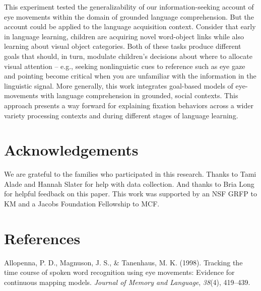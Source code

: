 \documentclass[10pt, letterpaper]{article}
\begin{document}
This experiment tested the generalizability of our information-seeking
account of eye movements within the domain of grounded language
comprehension. But the account could be applied to the language
acquisition context. Consider that early in language learning, children
are acquiring novel word-object links while also learning about visual
object categories. Both of these tasks produce different goals that
should, in turn, modulate children's decisions about where to allocate
visual attention -- e.g., seeking nonlinguistic cues to reference such
as eye gaze and pointing become critical when you are unfamiliar with
the information in the linguistic signal. More generally, this work
integrates goal-based models of eye-movements with language
comprehension in grounded, social contexts. This approach presents a way
forward for explaining fixation behaviors across a wider variety
processing contexts and during different stages of language learning.

\vspace{1em}
\vspace{1em}

\section{Acknowledgements}\label{acknowledgements}

We are grateful to the families who participated in this research.
Thanks to Tami Alade and Hannah Slater for help with data collection.
And thanks to Bria Long for helpful feedback on this paper. This work
was supported by an NSF GRFP to KM and a Jacobs Foundation Fellowship to
MCF.

\section{References}\label{references}

\setlength{\parindent}{-0.1in} \setlength{\leftskip}{0.125in} \noindent

\hypertarget{refs}{}
\hypertarget{ref-allopenna1998tracking}{}
Allopenna, P. D., Magnuson, J. S., \& Tanenhaus, M. K. (1998). Tracking
the time course of spoken word recognition using eye movements: Evidence
for continuous mapping models. \emph{Journal of Memory and Language},
\emph{38}(4), 419--439.
\end{document}
